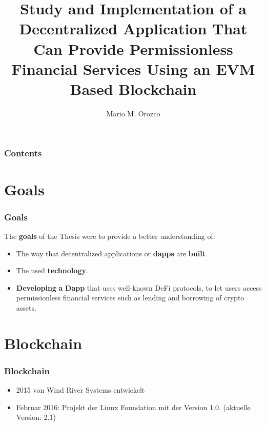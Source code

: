 \documentclass{beamer}
\title[]{Study and Implementation of a Decentralized
	Application That Can Provide Permissionless
	Financial Services Using an EVM Based Blockchain} %
\author{Mario M. Orozco} %
\institute[HSRM] %
{
Bachelor Colloquium
\medskip
}
\begin{document}
\begin{frame}
\titlepage %
\end{frame}

\begin{frame}
\frametitle{Contents} %
\tableofcontents %
\end{frame}

\section{Goals}
\begin{frame}
\frametitle{Goals}
The \textbf{goals} of the Thesis were to provide a better understanding of:
\linebreak
\begin{itemize}
	\item The way that decentralized applications or \textbf{dapps} are \textbf{built}. \\ 
	\item The used \textbf{technology}.\\ 
	\item \textbf{Developing} \textbf{a} \textbf{Dapp} that uses well-known DeFi protocols, to let users access
	permissionless financial services such as lending and borrowing of crypto
	assets.\\ 
\end{itemize}
\end{frame}

\section{Blockchain}
\begin{frame}
\frametitle{Blockchain}
\begin{itemize}
	\item 2015 von Wind River Systems  entwickelt\\
	\item Februar 2016: Projekt der Linux Foundation mit der Version 1.0. (aktuelle Version: 2.1)\\
\end{itemize}

\end{frame}
\end{document}
